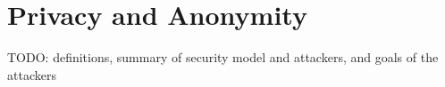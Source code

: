 \section{Privacy and Anonymity}
TODO: definitions, summary of security model and attackers, and goals of the attackers
